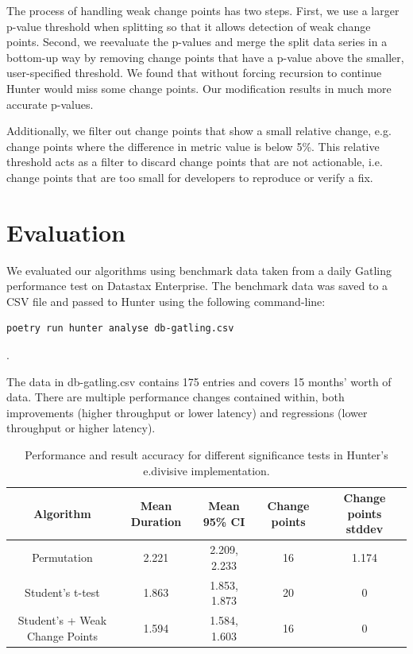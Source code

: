 \documentclass[sigconf]{acmart}
\begin{document}
The process of handling weak change points has two steps. First, we use a larger p-value threshold
when splitting so that it allows detection of weak change points. Second, we reevaluate the p-values and merge the split data series in a bottom-up way by removing change points that have a p-value above the smaller, user-specified threshold. We found that without forcing recursion to continue Hunter would miss some change points. Our modification results in much more accurate p-values.

Additionally, we filter out change points that show a small relative change, e.g. change points
where the difference in metric value is below 5\%. This relative threshold acts as a filter to discard change points that are not actionable, i.e. change points that are too small for developers to reproduce or verify a fix.

\section{Evaluation}
We evaluated our algorithms using benchmark data taken from a daily Gatling \cite{GATLING} performance test on Datastax Enterprise.
The benchmark data was saved to a CSV file and passed to Hunter using the
following command-line: \begin{verbatim}poetry run hunter analyse db-gatling.csv\end{verbatim}.

The data in db-gatling.csv contains 175 entries and covers 15 months’ worth of data. There are multiple performance changes contained within, both improvements (higher throughput or lower latency) and regressions (lower throughput or higher latency).

\begin{table}
\caption{Performance and result accuracy for different significance tests in Hunter's e.divisive implementation.}
\centering
\begin{tabular}{|c | c | c | c | c|}
\hline
Algorithm & Mean Duration & Mean 95\% CI & Change points & Change points stddev\\
\hline
Permutation & 2.221 & 2.209, 2.233 & 16 & 1.174 \\
Student's t-test & 1.863 & 1.853, 1.873 & 20 & 0 \\
Student's + Weak Change Points & 1.594 & 1.584, 1.603 & 16 & 0 \\
\hline
\end{tabular}
\end{table}
\end{document}
